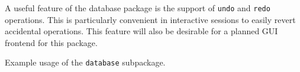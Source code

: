 A useful feature of the database package is the support of \texttt{undo}
and \texttt{redo} operations. This is particularly convenient in
interactive sessions to easily revert accidental operations. 
This feature will also be desirable for a planned GUI frontend for this package.

\begin{listing}[H]
\caption{Example usage of the \texttt{database} subpackage.}
\label{code:database}
\end{listing}

